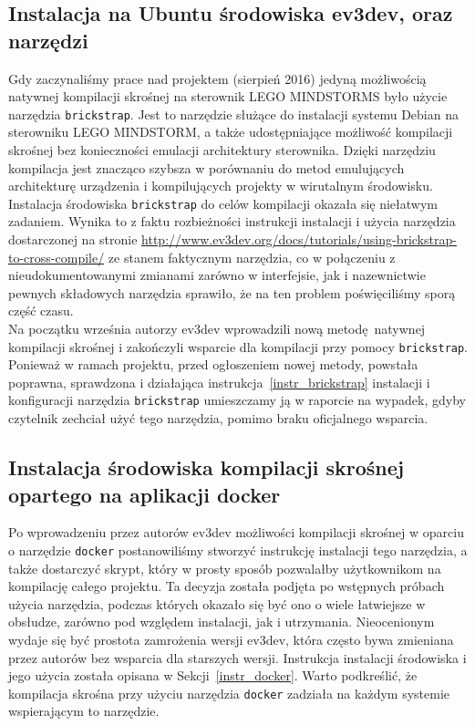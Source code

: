 \documentclass{article}
\begin{document}
\subsection{Instalacja na Ubuntu środowiska ev3dev, oraz narzędzi}
Gdy zaczynaliśmy prace nad projektem (sierpień 2016) jedyną możliwością natywnej
kompilacji skrośnej na sterownik LEGO MINDSTORMS było użycie narzędzia
\texttt{brickstrap}. Jest to narzędzie służące do instalacji systemu Debian na
sterowniku LEGO MINDSTORM, a także udostępniające możliwość kompilacji skrośnej
bez konieczności emulacji architektury sterownika. Dzięki narzędziu kompilacja
jest znacząco szybsza w porównaniu do metod emulujących architekturę urządzenia
i kompilujących projekty w wirutalnym środowisku.\\
Instalacja środowiska \texttt{brickstrap} do celów kompilacji okazała się
niełatwym zadaniem. Wynika to z faktu rozbieżności instrukcji instalacji i
użycia narzędzia dostarczonej na stronie
\url{http://www.ev3dev.org/docs/tutorials/using-brickstrap-to-cross-compile/} ze
stanem faktycznym narzędzia, co w połączeniu z nieudokumentowanymi zmianami
zarówno w interfejsie, jak i nazewnictwie pewnych składowych narzędzia
sprawiło, że na ten problem poświęciliśmy sporą część czasu.\\
Na początku września autorzy ev3dev wprowadzili nową metodę natywnej kompilacji
skrośnej i zakończyli wsparcie dla kompilacji przy pomocy \texttt{brickstrap}.
Ponieważ w ramach projektu, przed ogłoszeniem nowej metody, powstała poprawna,
sprawdzona i działająca instrukcja~\ref{instr_brickstrap}
instalacji i konfiguracji narzędzia \texttt{brickstrap} umieszczamy ją w
raporcie na wypadek, gdyby czytelnik zechciał użyć tego narzędzia, pomimo braku
oficjalnego wsparcia.
\subsection{Instalacja środowiska kompilacji skrośnej opartego na aplikacji
    docker}
Po wprowadzeniu przez autorów ev3dev możliwości kompilacji skrośnej w oparciu o
narzędzie \texttt{docker} postanowiliśmy stworzyć instrukcję instalacji tego
narzędzia, a także dostarczyć skrypt, który w prosty sposób pozwalałby
użytkownikom na kompilację całego projektu. Ta decyzja została podjęta po
wstępnych próbach użycia narzędzia, podczas których okazało się być ono o wiele
łatwiejsze w obsłudze, zarówno pod względem instalacji, jak i utrzymania.
Nieocenionym wydaje się być prostota zamrożenia wersji ev3dev, która często bywa
zmieniana przez autorów bez wsparcia dla starszych wersji. Instrukcja instalacji
środowiska i jego użycia została opisana w Sekcji~\ref{instr_docker}. Warto
podkreślić, że kompilacja skrośna przy użyciu narzędzia \texttt{docker} zadziała
na każdym systemie wspierającym to narzędzie.
\end{document}
